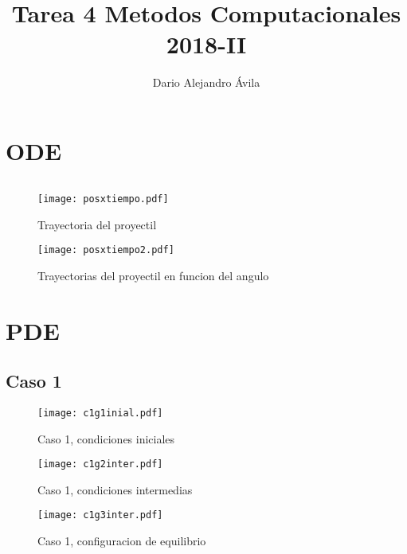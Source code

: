 \documentclass[reprint,amsmath,amssymb]{revtex4-1}
\begin{document}
\title{\Huge Tarea 4 Metodos Computacionales 2018-II }

\author{Dario Alejandro Ávila }




\maketitle
\section{\label{sec:level1}ODE}

\begin{equation}

\end{equation}

\begin{figure}[h!]
    \centering
    \texttt{[image: posxtiempo.pdf]}
    \caption{Trayectoria del proyectil}

\end{figure}

\begin{figure}[h!]
    \centering
    \texttt{[image: posxtiempo2.pdf]}
    \caption{Trayectorias del proyectil en funcion del angulo}
\end{figure}


\section{\label{sec:level1}PDE}
\subsection{Caso 1}



\begin{figure}[h!]
    \centering
    \texttt{[image: c1g1inial.pdf]}
    \caption{Caso 1, condiciones iniciales}
\end{figure}

\begin{figure}[h!]
    \centering
    \texttt{[image: c1g2inter.pdf]}
    \caption{Caso 1, condiciones intermedias}
\end{figure}

\begin{figure}[h!]
    \centering
    \texttt{[image: c1g3inter.pdf]}
    \caption{Caso 1, configuracion de equilibrio}
\end{figure}
\end{document}
